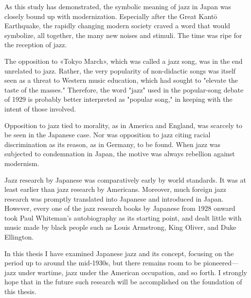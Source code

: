 As this study has demonstrated, the symbolic meaning of jazz in Japan was closely bound up with modernization. Especially after the Great Kantō Earthquake, the rapidly changing modern society craved a word that would symbolize, all together, the many new noises and stimuli. The time was ripe for the reception of jazz.

The opposition to «Tokyo March», which was called a jazz song, was in the end unrelated to jazz. Rather, the very popularity of non-didactic songs was itself seen as a threat to Western music education, which had sought to "elevate the taste of the masses." Therefore, the word "jazz" used in the popular-song debate of 1929 is probably better interpreted as "popular song," in keeping with the intent of those involved.

Opposition to jazz tied to morality, as in America and England, was scarcely to be seen in the Japanese case. Nor was opposition to jazz citing racial discrimination as its reason, as in Germany, to be found. When jazz was subjected to condemnation in Japan, the motive was always rebellion against modernism.

Jazz research by Japanese was comparatively early by world standards. It was at least earlier than jazz research by Americans. Moreover, much foreign jazz research was promptly translated into Japanese and introduced in Japan. However, every one of the jazz research books by Japanese from 1928 onward took Paul Whiteman's autobiography as its starting point, and dealt little with music made by black people such as Louis Armstrong, King Oliver, and Duke Ellington.

In this thesis I have examined Japanese jazz and its concept, focusing on the period up to around the mid-1930s, but there remains room to be pioneered—jazz under wartime, jazz under the American occupation, and so forth. I strongly hope that in the future such research will be accomplished on the foundation of this thesis.

